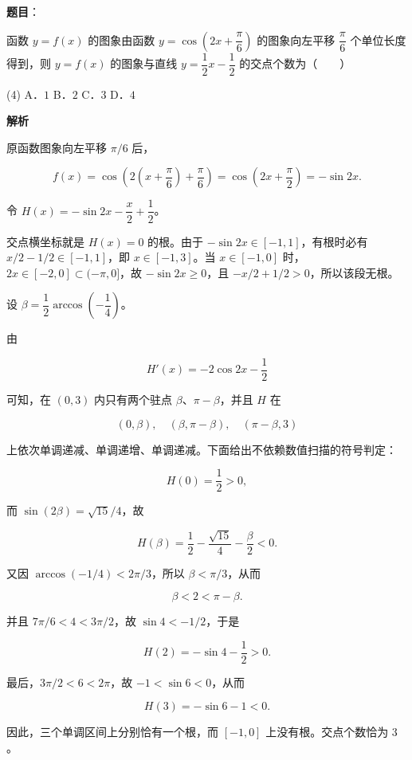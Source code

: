 \begin{answer}

\textbf{题目}：

函数 $y=f(x)$ 的图象由函数 $y=\cos\left(2x+\dfrac\pi6\right)$ 的图象向左平移 $\dfrac\pi6$ 个单位长度得到，则 $y=f(x)$ 的图象与直线 $y=\dfrac12x-\dfrac12$ 的交点个数为\mbox{（　　）}

\begin{gkopts}(4)
\task A．$1$
\task B．$2$
\task C．$3$
\task D．$4$
\end{gkopts}

\textbf{解析}

原函数图象向左平移 $\pi/6$ 后，

\nopagebreak[4]
\[
f(x)=\cos\left(2\left(x+\frac\pi6\right)+\frac\pi6\right)
=\cos\left(2x+\frac\pi2\right)=-\sin2x.
\]

令 $H(x)=-\sin2x-\dfrac x2+\dfrac12$。

交点横坐标就是 $H(x)=0$ 的根。由于 $-\sin2x\in[-1,1]$，有根时必有 $x/2-1/2\in[-1,1]$，即 $x\in[-1,3]$。当 $x\in[-1,0]$ 时，$2x\in[-2,0]\subset(-\pi,0]$，故 $-\sin2x\geqslant0$，且 $-x/2+1/2>0$，所以该段无根。

设 $\beta=\dfrac12\arccos\left(-\dfrac14\right)$。

由

\nopagebreak[4]
\[
H'(x)=-2\cos2x-\frac12
\]

可知，在 $(0,3)$ 内只有两个驻点 $\beta$、$\pi-\beta$，并且 $H$ 在

\nopagebreak[4]
\[
(0,\beta),\quad(\beta,\pi-\beta),\quad(\pi-\beta,3)
\]

上依次单调递减、单调递增、单调递减。下面给出不依赖数值扫描的符号判定：

\nopagebreak[4]
\[
H(0)=\frac12>0,
\]

而 $\sin(2\beta)=\sqrt{15}/4$，故

\nopagebreak[4]
\[
H(\beta)=\frac12-\frac{\sqrt{15}}4-\frac\beta2<0.
\]

又因 $\arccos(-1/4)<2\pi/3$，所以 $\beta<\pi/3$，从而

\nopagebreak[4]
\[
\beta<2<\pi-\beta.
\]

并且 $7\pi/6<4<3\pi/2$，故 $\sin4<-1/2$，于是

\nopagebreak[4]
\[
H(2)=-\sin4-\frac12>0.
\]

最后，$3\pi/2<6<2\pi$，故 $-1<\sin6<0$，从而

\nopagebreak[4]
\[
H(3)=-\sin6-1<0.
\]

因此，三个单调区间上分别恰有一个根，而 $[-1,0]$ 上没有根。交点个数恰为 $3$。


\par\medskip

\end{answer}

